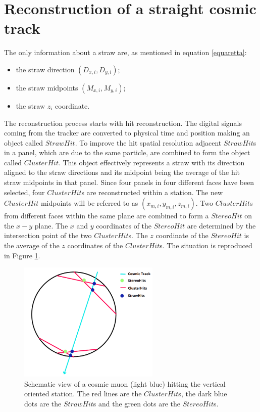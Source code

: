 \section{Reconstruction of a straight cosmic track}\label{reconstruction}
The only information about a straw are, as mentioned in equation \ref{equaretta}:
\begin{itemize}
    \item the straw direction $(D_{x,i},D_{y,i})$;
    \item the straw midpoints $(M_{x,i},M_{y,i})$;
    \item the straw $z_i$ coordinate.
\end{itemize} 
The reconstruction process starts with hit reconstruction. The digital
signals coming from the tracker are converted to physical time and position making an object
called $StrawHit$. To improve the hit spatial resolution adjacent $StrawHit$s in a panel, which are
due to the same particle, are combined to form the object called $ClusterHit$.
This object effectively represents a straw with its direction aligned to the straw directions and its midpoint 
being the average of the hit straw midpoints in that panel. Since four panels in four different faces have been selected,  
four $ClusterHit$s are reconstructed within a station. The new $ClusterHit$ midpoints will be referred to as $(x_{m,i}, y_{m,i}, z_{m,i})$.
Two $ClusterHit$s from different faces within the same plane are combined to form a $StereoHit$ on the $x-y$ plane. 
The $x$ and $y$ coordinates of the $StereoHit$ are determined by the intersection point of the two 
$ClusterHit$s. The $z$ coordinate of the $StereoHit$ is the average of the $z$ coordinates of the $ClusterHit$s.
The situation is reproduced in Figure \ref{fig:stco}.
\begin{figure}[!h]
    \centering
    \includegraphics[width =0.6\textwidth]{figures/png/Screenshot_20240810_210144.png}
    \caption[Schematic view of a cosmic muon hitting the vertical oriented station.]{Schematic view of a cosmic muon (light blue) hitting the vertical oriented station. The red lines are the $ClusterHit$s, the dark blue dots 
    are the $StrawHit$s and the green dots are the $StereoHit$s.}
    \label{fig:stco}
\end{figure}
